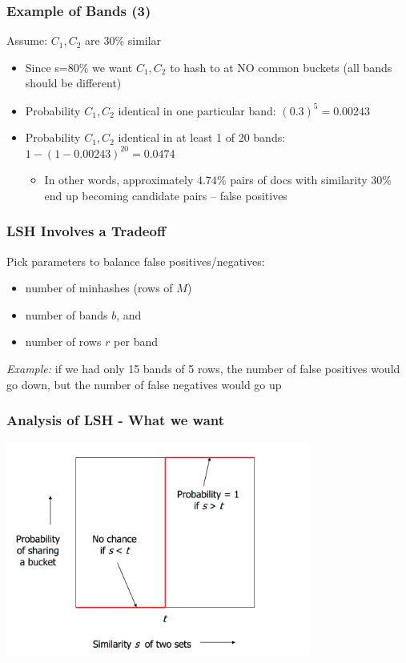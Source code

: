 \documentclass[svgnames]{beamer}
\begin{document}
  
\begin{frame} \frametitle{Example of Bands (3)}

\begin{block}{Assume: $C_1, C_2$ are 30\% similar}
\begin{itemize}
\item Since s=80\% we want $C_1, C_2$ to hash to at NO common buckets (all bands should be different)
\item Probability $C_1, C_2$ identical in one particular band: $(0.3)^5 = 0.00243$
\item Probability $C_1, C_2$ identical in at least 1 of 20 bands: $1 - (1 - 0.00243)^{20} = 0.0474$
  \begin{itemize}
  \item In other words, approximately $4.74$\% pairs of docs with similarity 30\% end up becoming candidate pairs -- false positives
  \end{itemize}
\end{itemize}
\end{block}
\end{frame}

  
\begin{frame} \frametitle{LSH Involves a Tradeoff}
\begin{block}{}
Pick parameters to balance false positives/negatives:
\begin{itemize}
  \item number of minhashes (rows of $M$)
  \item number of bands $b$, and
  \item number of rows $r$ per band
\end{itemize}
\end{block}

\emph{Example:} if we had only 15 bands of 5 rows, the number of false positives would go down, but the number of false negatives would go up
\end{frame}

  
\begin{frame} \frametitle{Analysis of LSH - What we want}
\includegraphics[width=10cm]{what-we-want}
\end{frame}
\end{document}
